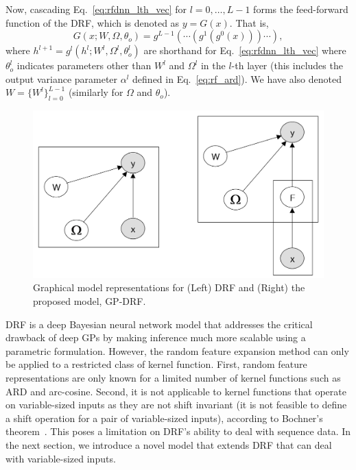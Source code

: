 \documentclass[conference]{IEEEtran}
\begin{document}
Now, cascading Eq.~\ref{eq:rfdnn_lth_vec} for $l=0,\dots,L-1$ forms the feed-forward 
function of the DRF, which is denoted as $y = G(x)$. That is,
\begin{equation}
G(x; W, \Omega, \theta_o) = g^{L-1}(\cdots (g^1(g^0(x))) \cdots),
\label{eq:rfdnn_fwd}
\end{equation}
where $h^{l+1} = g^l(h^l; W^l, \Omega^l, \theta^l_o)$ are shorthand for 
Eq.~\ref{eq:rfdnn_lth_vec} where $\theta^l_o$ indicates parameters other than 
$W^l$ and $\Omega^l$ in the $l$-th layer (this includes the output variance parameter 
$\alpha^l$ defined in Eq.~\ref{eq:rf_ard}). We have also denoted $W = \{ W^l \}_{l=0}^{L-1}$ 
(similarly for $\Omega$ and $\theta_o$).


\begin{figure}
\begin{center}
\includegraphics[trim = 0mm 0mm 0mm 0mm, clip, scale=0.425]{figs/drf_gpdrf}
\end{center}
\vspace{-0.8em}
\caption{Graphical model representations for (Left) DRF and (Right) the proposed model, GP-DRF.}
\label{fig:rfdnn}
\vspace{-0.5em}
\end{figure}

DRF is a deep Bayesian neural network model that addresses the critical drawback of deep GPs by making inference much more scalable using a parametric formulation. However, the random feature expansion method can only be applied to a restricted class of kernel function. First, random feature representations are only known for a limited number of kernel functions such as ARD and arc-cosine. Second, it is not applicable to kernel functions that operate on variable-sized inputs as they are not shift invariant (it is not feasible to define a shift operation for a pair of variable-sized inputs), according to Bochner's theorem~\cite{rudin_book}. This poses a limitation on DRF's ability to deal with sequence data. In the next section, we introduce a novel model that extends DRF that can deal with variable-sized inputs.
\end{document}
